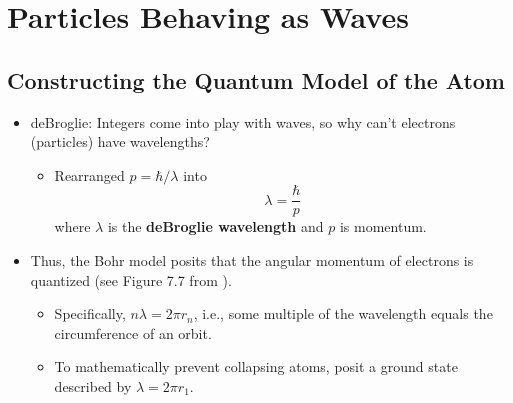 \documentclass[../notes.tex]{subfiles}
\begin{document}
\chapter{Particles Behaving as Waves}
\section{Constructing the Quantum Model of the Atom}
\begin{itemize}
    \item {}deBroglie: Integers come into play with waves, so why can't electrons (particles) have wavelengths?
    \begin{itemize}
        \item Rearranged $p=\hbar/\lambda$ into
        \begin{equation*}
            \lambda = \frac{\hbar}{p}
        \end{equation*}
        where $\lambda$ is the \textbf{deBroglie wavelength} and $p$ is momentum.
    \end{itemize}
    \item Thus, the Bohr model posits that the angular momentum of electrons is quantized (see Figure 7.7 from \textcite{bib:APChemNotes}).
    \begin{itemize}
        \item Specifically, $n\lambda=2\pi r_n$, i.e., some multiple of the wavelength equals the circumference of an orbit.
        \item To mathematically prevent collapsing atoms, posit a ground state described by $\lambda=2\pi r_1$.
    \end{itemize}
\end{itemize}
\end{document}
